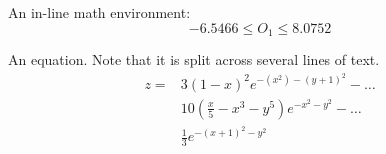 An in-line math environment:
\[
-6.5466 \leq O_1 \leq 8.0752
\]

An equation.  Note that it is split across several lines of text.
\begin{equation}
\label{eq:peaks}
\begin{split}
z = &3(1-x)^2e^{-(x^2) - (y+1)^2} - \ldots \\
&10(\frac{x}{5}-x^3 - y^5)e^{-x^2-y^2}- \ldots \\
&\frac{1}{3}e^{-(x+1)^2 - y^2}
\end{split}
\end{equation}


